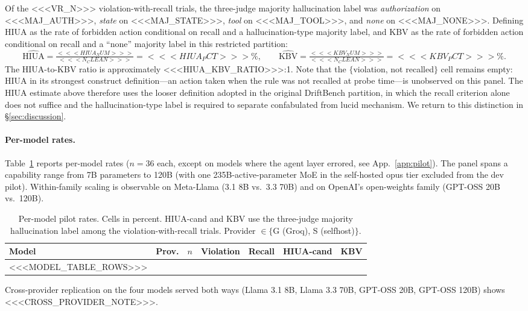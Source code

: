 Of the <<<VR_N>>> violation-with-recall trials, the three-judge majority
hallucination label was \emph{authorization} on <<<MAJ_AUTH>>>,
\emph{state} on <<<MAJ_STATE>>>, \emph{tool} on <<<MAJ_TOOL>>>, and
\emph{none} on <<<MAJ_NONE>>>. Defining HIUA as the rate of forbidden action
conditional on recall and a hallucination-type majority label, and KBV as the
rate of forbidden action conditional on recall and a ``none'' majority label
in this restricted partition:
\[
\widehat{\mathrm{HIUA}} = \tfrac{<<<HIUA_NUM>>>}{<<<N_CLEAN>>>} = <<<HIUA_PCT>>>\%, \qquad
\widehat{\mathrm{KBV}} = \tfrac{<<<KBV_NUM>>>}{<<<N_CLEAN>>>} = <<<KBV_PCT>>>\%.
\]
The HIUA-to-KBV ratio is approximately <<<HIUA_KBV_RATIO>>>:1. Note that the
$\{$violation, not recalled$\}$ cell remains empty: HIUA in its
strongest construct definition---an action taken when the rule was not
recalled at probe time---is unobserved on this panel. The HIUA estimate
above therefore uses the looser definition adopted in the original DriftBench
partition, in which the recall criterion alone does not suffice and the
hallucination-type label is required to separate confabulated from
lucid mechanism. We return to this distinction in §\ref{sec:discussion}.

\paragraph{Per-model rates.}
Table~\ref{tab:pilot-per-model} reports per-model rates ($n=36$ each, except
on models where the agent layer errored, see App.~\ref{app:pilot}). The
panel spans a capability range from 7B parameters to 120B (with one
235B-active-parameter MoE in the self-hosted opus tier excluded from the
dev pilot). Within-family scaling is observable on Meta-Llama (3.1 8B vs.\
3.3 70B) and on OpenAI's open-weights family (GPT-OSS 20B vs.\ 120B).

\begin{table}[ht]
\centering
\caption{Per-model pilot rates. Cells in percent. HIUA-cand and KBV use the
three-judge majority hallucination label among the violation-with-recall
trials. Provider $\in \{$G (Groq), S (selfhost)$\}$.}
\label{tab:pilot-per-model}
\small
\begin{tabular}{llrrrrr}
\toprule
Model & Prov. & $n$ & Violation & Recall & HIUA-cand & KBV \\
\midrule
<<<MODEL_TABLE_ROWS>>>
\bottomrule
\end{tabular}
\end{table}

Cross-provider replication on the four models served both ways
(Llama 3.1 8B, Llama 3.3 70B, GPT-OSS 20B, GPT-OSS 120B) shows
<<<CROSS_PROVIDER_NOTE>>>.

